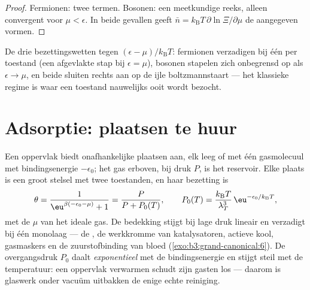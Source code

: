 \begin{proof}
Fermionen: twee termen. Bosonen: een meetkundige reeks, alleen convergent
voor $\mu < \epsilon$. In beide gevallen geeft $\bar n = k_{\text{B}}T\,
\partial\ln\Xi/\partial\mu$ de aangegeven vormen.
\end{proof}

\begin{omfigure}

{\small De drie bezettingswetten tegen $(\epsilon -
\mu)/k_{\text{B}}T$: fermionen verzadigen bij één per toestand (een
afgevlakte stap bij $\epsilon = \mu$), bosonen stapelen zich onbegrensd op
als $\epsilon \to \mu$, en beide sluiten rechts aan op de ijle
boltzmannstaart --- het klassieke regime is waar een toestand nauwelijks
ooit wordt bezocht.}
\end{omfigure}

\section{Adsorptie: plaatsen te huur}

\begin{proposition}\label{prop:b3:grand-canonical:langmuir}
Een oppervlak biedt onafhankelijke plaatsen aan, elk leeg of met één
gasmolecuul met bindingsenergie $-\epsilon_0$; het gas erboven, bij druk
$P$, is het reservoir. Elke plaats is een groot stelsel met twee
toestanden, en haar bezetting is
\[
\theta = \frac{1}{\eu^{\beta(-\epsilon_0 - \mu)} + 1}
 = \frac{P}{P + P_0(T)} , \qquad
P_0(T) = \frac{k_{\text{B}}T}{\lambda_T^3}\,
\eu^{-\epsilon_0/k_{\text{B}}T} ,
\]
met de $\mu$ van het ideale gas. De bedekking stijgt bij lage druk lineair
en verzadigt bij één monolaag --- de \emph{}, de
werkkromme van katalysatoren, actieve kool, gasmaskers en de zuurstofbinding
van bloed (\cref{exo:b3:grand-canonical:6}). De overgangsdruk $P_0$ daalt
\emph{exponentieel} met de bindingsenergie en stijgt steil met de
temperatuur: een oppervlak verwarmen schudt zijn gasten los --- daarom is
glaswerk onder vacuüm uitbakken de enige echte reiniging.
\end{proposition}

